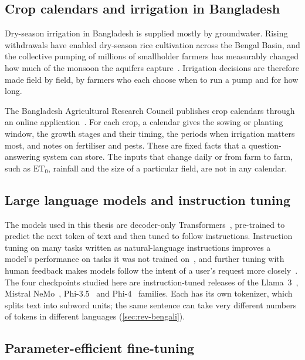 \subsection{Crop calendars and irrigation in Bangladesh}
\label{sec:prelim-barc}

Dry-season irrigation in Bangladesh is supplied mostly by groundwater. Rising withdrawals have enabled dry-season rice cultivation across the Bengal Basin, and the collective pumping of millions of smallholder farmers has measurably changed how much of the monsoon the aquifers capture~\cite{shamsudduha2022bengal}. Irrigation decisions are therefore made field by field, by farmers who each choose when to run a pump and for how long.

The Bangladesh Agricultural Research Council publishes crop calendars through an online application~\cite{barc2026cropcalendar}. For each crop, a calendar gives the sowing or planting window, the growth stages and their timing, the periods when irrigation matters most, and notes on fertiliser and pests. These are fixed facts that a question-answering system can store. The inputs that change daily or from farm to farm, such as $\mathrm{ET}_0$, rainfall and the size of a particular field, are not in any calendar.

\subsection{Large language models and instruction tuning}
\label{sec:prelim-llm}

The models used in this thesis are decoder-only Transformers~\cite{vaswani2017attention}, pre-trained to predict the next token of text and then tuned to follow instructions. Instruction tuning on many tasks written as natural-language instructions improves a model's performance on tasks it was not trained on~\cite{wei2022finetuned}, and further tuning with human feedback makes models follow the intent of a user's request more closely~\cite{ouyang2022training}. The four checkpoints studied here are instruction-tuned releases of the Llama~3~\cite{grattafiori2024llama}, Mistral NeMo~\cite{mistral2024nemo}, Phi-3.5~\cite{abdin2024phi3} and Phi-4~\cite{microsoft2025phi4mini} families. Each has its own tokenizer, which splits text into subword units; the same sentence can take very different numbers of tokens in different languages (\cref{sec:rev-bengali}).

\subsection{Parameter-efficient fine-tuning}
\label{sec:prelim-peft}

